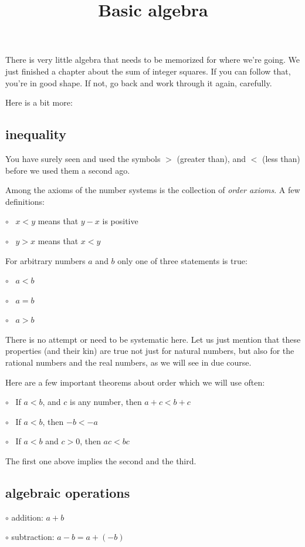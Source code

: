 \documentclass[11pt, oneside]{article}
\title{Basic algebra}
\date{}
\begin{document}
\maketitle
\Large

There is very little algebra that needs to be memorized for where we're going.  We just finished a chapter about the sum of integer squares.  If you can follow that, you're in good shape.  If not, go back and work through it again, carefully.

Here is a bit more:

\subsection*{inequality}
You have surely seen and used the symbols $>$ (greater than), and $<$ (less than) before we used them a second ago.

Among the axioms of the number systems is the collection of \emph{order axioms}.  A few definitions:

$\circ$ \ $x < y$ means that $y - x$ is positive

$\circ$ \ $y > x$ means that $x < y$

For arbitrary numbers $a$ and $b$ only one of three statements is true:  

$\circ$ \ $a < b$

$\circ$ \ $a = b$

$\circ$ \ $a > b$

There is no attempt or need to be systematic here.  Let us just mention that these properties (and their kin) are true not just for natural numbers, but also for the rational numbers and the real numbers, as we will see in due course.  

Here are a few important theorems about order which we will use often:

$\circ$ \ If $a < b$, and $c$ is any number, then $a + c < b + c$

$\circ$ \ If $a < b$, then $-b < -a$

$\circ$ \ If $a < b$ and $c > 0$, then $ac < bc$

The first one above implies the second and the third.

\subsection*{algebraic operations}

$\circ$ addition:  $a + b$

$\circ$ subtraction:  $a - b = a + (-b)$
\end{document}
